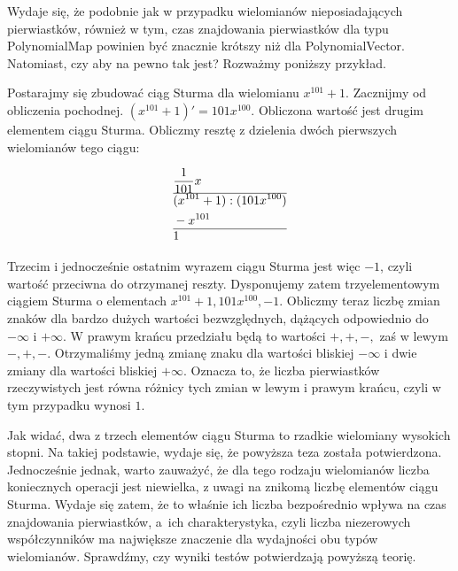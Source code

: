 Wydaje się, że podobnie jak w przypadku wielomianów nieposiadających pierwiastków, również w tym, czas znajdowania pierwiastków dla typu PolynomialMap powinien być znacznie krótszy niż dla PolynomialVector. Natomiast, czy aby na pewno tak jest? Rozważmy poniższy przykład.

Postarajmy się zbudować ciąg Sturma dla wielomianu $x^{101}+1$. Zacznijmy od obliczenia pochodnej. $(x^{101}+1)'=101x^{100}$.
Obliczona wartość jest drugim elementem ciągu Sturma. Obliczmy resztę z dzielenia dwóch pierwszych wielomianów tego ciągu:

\begin{equation*}
\begin{split}
&\frac{1}{101}x \\
\hline
&(x^{101}+1) : (101x^{100}) \\
&-x^{101} \\
\hline
&1
\end{split}
\end{equation*}

Trzecim i jednocześnie ostatnim wyrazem ciągu Sturma jest więc $-1$, czyli wartość przeciwna do otrzymanej reszty. Dysponujemy zatem trzyelementowym ciągiem Sturma o elementach ${x^{101}+1, 101x^{100}, -1}$. Obliczmy teraz liczbę zmian znaków dla bardzo dużych wartości bezwzględnych, dążących odpowiednio do $-\infty$ i $+\infty$. W prawym krańcu przedziału będą to wartości $+,+,-,$ zaś w lewym $-,+,-.$ Otrzymaliśmy jedną zmianę znaku dla wartości bliskiej $-\infty$ i dwie zmiany dla wartości bliskiej $+\infty$. Oznacza to, że liczba pierwiastków rzeczywistych jest równa różnicy tych zmian w lewym i prawym krańcu, czyli w tym przypadku wynosi $1$.

Jak widać, dwa z trzech elementów ciągu Sturma to rzadkie wielomiany wysokich stopni. Na takiej podstawie, wydaje się, że powyższa teza została potwierdzona. Jednocześnie jednak, warto zauważyć, że dla tego rodzaju wielomianów liczba koniecznych operacji jest niewielka, z uwagi na znikomą liczbę elementów ciągu Sturma. Wydaje się zatem, że to właśnie ich liczba bezpośrednio wpływa na czas znajdowania pierwiastków, a~ich charakterystyka, czyli liczba niezerowych współczynników ma największe znaczenie dla wydajności obu typów wielomianów. Sprawdźmy, czy wyniki testów potwierdzają powyższą teorię.


